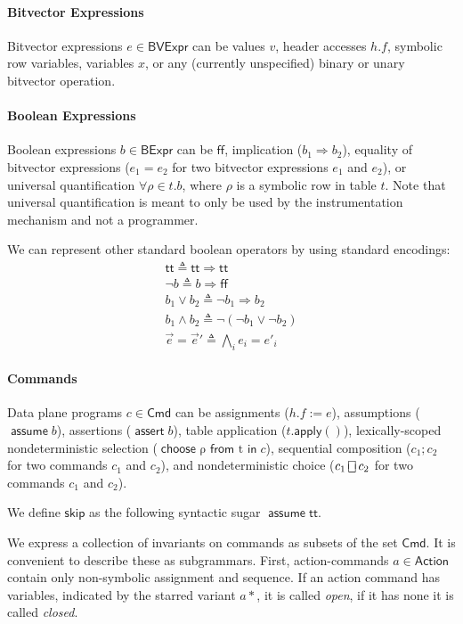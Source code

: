 \documentclass{article}
\newcommand{\TRUE}{\mathsf{tt}}
\newcommand{\FALSE}{\mathsf{ff}}
\newcommand{\BVExpr}{\mathsf{BVExpr}}
\newcommand{\BExpr}{\mathsf{BExpr}}
\newcommand{\Cmd}{\mathsf{Cmd}}
\newcommand{\Action}{\mathsf{Action}}
\newcommand{\assert}{\mathop{\mathsf{assert}}}
\newcommand{\assume}{\mathop{\mathsf{assume}}}
\newcommand{\apply}{\mathsf{apply}}
\newcommand{\choiceop}{\rotatebox[origin=c]{90}{$\sqsubset\!\!\!\sqsupset$}}
\newcommand{\choice}{\mathbin{\choiceop}}
\renewcommand{\choose}[2]{\mathop{\mathsf{choose}~#1~\mathsf{from}~#2~\mathsf{in}}}
\newcommand{\SKIP}{\mathsf{skip}}
\begin{document}
\paragraph{Bitvector Expressions}
Bitvector expressions $e \in \BVExpr$ can be values $v$, header accesses $h.f$,
symbolic row variables, variables $x$, or any
(currently unspecified) binary or unary bitvector operation.

\paragraph{Boolean Expressions}
Boolean expressions $b \in \BExpr$ can be $\FALSE$, implication ($b_1
\Rightarrow b_2$), equality of bitvector expressions ($e_1 = e_2$ for two
bitvector expressions $e_1$ and $e_2$), or universal quantification $\forall
\rho \in t. b$, where $\rho$ is a symbolic row in table $t$. Note that universal
quantification is meant to only be used by the instrumentation mechanism and not
a programmer.

We can represent other standard boolean operators by using standard encodings:
\[\begin{array}{l}
  \TRUE \triangleq \TRUE \Rightarrow \TRUE \\
  \neg b \triangleq b \Rightarrow \FALSE \\
  b_1 \vee b_2 \triangleq \neg b_1 \Rightarrow b_2 \\
  b_1 \wedge b_2 \triangleq \neg(\neg b_1 \vee \neg b_2) \\
  \vec e = \vec e' \triangleq \bigwedge_i e_i = e'_i
\end{array}\]

\paragraph{Commands}
Data plane programs $c \in \mathsf{Cmd}$ can be assignments ($h.f := e$),
assumptions ($\assume b$), assertions ($\assert b$), table application
($t.\apply()$), lexically-scoped nondeterministic selection ($\choose \rho t
c$), sequential composition ($c_1;c_2$ for two commands $c_1$ and $c_2$), and
nondeterministic choice ($c_1 \choice c_2$ for two commands $c_1$ and $c_2$).

We define $\SKIP$ as the following syntactic sugar $\assume \TRUE$.

We express a collection of invariants on commands as subsets of the set $\Cmd$.
It is convenient to describe these as subgrammars. First, action-commands $a \in
\Action$ contain only non-symbolic assignment and sequence. If an action
command has variables, indicated by the starred variant $a*$, it is called
\emph{open}, if it has none it is called \emph{closed}.
\end{document}
